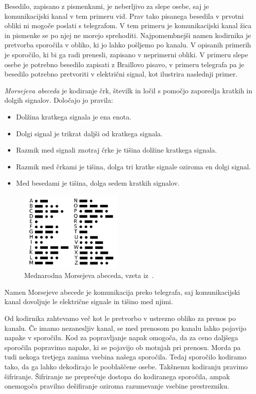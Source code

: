 \documentclass[fin1, tisk]{fmfdelo}
\theoremstyle{definition}
\begin{document}
Besedilo, zapisano z pismenkami, je neberljivo za slepe osebe, saj je komunikacijski kanal v tem
primeru vid. Prav tako pisanega besedila v prvotni obliki ni mogoče poslati s telegrafom. 
V tem primeru je komunikacijski kanal žica in pismenke se po njej ne morejo sprehoditi. 
Najpomembnejši namen kodirnika je pretvorba sporočila v obliko, ki jo lahko pošljemo po kanalu.
V opisanih primerih je sporočilo, ki bi ga radi prenesli, zapisano v neprimerni obliki. V primeru
slepe osebe je potrebno besedilo zapisati z Braillovo pisavo, v primeru telegrafa pa je besedilo 
potrebno pretvoriti v električni signal, kot ilustrira naslednji primer.
\begin{primer}\label{primer:mors}
    \emph{Morsejeva abeceda} je kodiranje črk, številk in ločil s pomočjo 
    zaporedja kratkih in dolgih signalov. Določajo jo pravila:
    \begin{itemize}
        \item Dolžina kratkega signala je ena enota.
        \item Dolgi signal je trikrat daljši od kratkega signala.
        \item Razmik med signali znotraj črke je tišina dolžine kratkega signala.
        \item Razmik med črkami je tišina, dolga tri kratke signale oziroma en dolgi signal.
        \item Med besedami je tišina, dolga sedem kratkih signalov.
    \end{itemize}
    \begin{figure}[H]
        \centering
        \includegraphics[width=5cm]{1280px-InternationalMorseCode.svg.png}
        \caption{Mednarodna Morsejeva abeceda, vzeta iz~\cite{morseletters}.}
        \label{fig:morse}
    \end{figure}
    Namen Morsejeve abecede je komunikacija preko telegrafa, saj komunikacijski kanal dovoljuje 
    le električne signale in tišino med njimi.
\end{primer}

Od kodirnika zahtevamo več kot le pretvorbo v ustrezno obliko za prenos po kanalu.
Če imamo nezanesljiv kanal, se med prenosom po kanalu lahko pojavijo napake v sporočilu.
Kod za popravljanje napak omogoča, da za ceno daljšega sporočila popravimo napake, ki se 
pojavijo ob motnjah pri prenosu. %
Morda pa tudi nekoga tretjega zanima vsebina našega sporočila. Tedaj sporočilo kodiramo
tako, da ga lahko dekodirajo le pooblaščene osebe. Takšnemu kodiranju pravimo
šifriranje. Šifriranje ne preprečuje dostopa do kodiranega sporočila, ampak onemogoča pravilno
dešifiranje oziroma razumevanje vsebine prestrezniku. %
\end{document}
